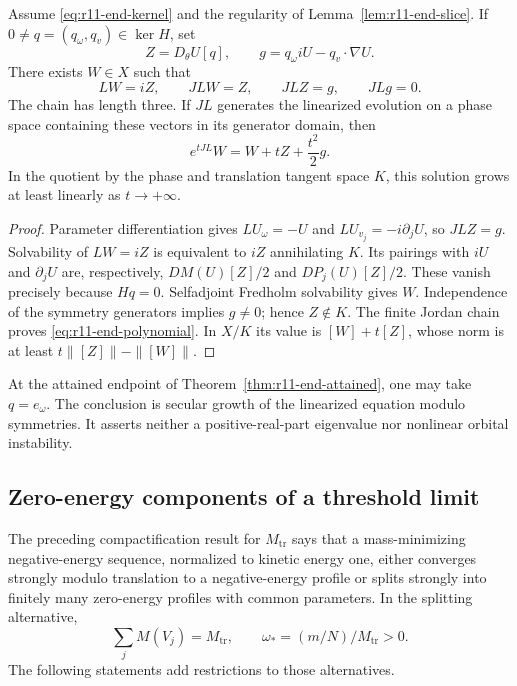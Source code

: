 \begin{theorem}
\label{thm:r11-end-jordan}
Assume \eqref{eq:r11-end-kernel} and the regularity of
Lemma~\ref{lem:r11-end-slice}.  If $0\ne q=(q_\omega,q_v)\in\ker H$,
set
\[
 Z=D_\theta U[q],\qquad
 g=q_\omega iU-q_v\cdot\nabla U.
\]
There exists $W\in X$ such that
\begin{equation}\label{eq:r11-end-chain}
 LW=iZ,\qquad JLW=Z,\qquad JLZ=g,\qquad JLg=0.
\end{equation}
The chain has length three.  If $JL$ generates the linearized evolution
on a phase space containing these vectors in its generator domain, then
\begin{equation}\label{eq:r11-end-polynomial}
 e^{tJL}W=W+tZ+\frac{t^2}{2}g.
\end{equation}
In the quotient by the phase and translation tangent space $K$, this
solution grows at least linearly as $t\to+\infty$.
\end{theorem}
\begin{proof}
Parameter differentiation gives
$LU_\omega=-U$ and $LU_{v_j}=-i\partial_jU$, so $JLZ=g$.
Solvability of $LW=iZ$ is equivalent to $iZ$ annihilating $K$.
Its pairings with $iU$ and $\partial_jU$ are, respectively,
$DM(U)[Z]/2$ and $DP_j(U)[Z]/2$.  These vanish precisely because
$Hq=0$.  Selfadjoint Fredholm solvability gives $W$.
Independence of the symmetry generators implies $g\ne0$; hence
$Z\notin K$.  The finite Jordan chain proves
\eqref{eq:r11-end-polynomial}.  In $X/K$ its value is $[W]+t[Z]$,
whose norm is at least $t\|[Z]\|-\|[W]\|$.
\end{proof}

At the attained endpoint of Theorem~\ref{thm:r11-end-attained}, one may
take $q=e_\omega$.  The conclusion is secular growth of the linearized
equation modulo symmetries.  It asserts neither a positive-real-part
eigenvalue nor nonlinear orbital instability.

\subsection{Zero-energy components of a threshold limit}

The preceding compactification result for $M_{\mathrm{tr}}$ says that a
mass-minimizing negative-energy sequence, normalized to kinetic energy
one, either converges strongly modulo translation to a negative-energy
profile or splits strongly into finitely many zero-energy profiles with
common parameters.  In the splitting alternative,
\[
 \sum_jM(V_j)=M_{\mathrm{tr}},\qquad
 \omega_*=(m/N)/M_{\mathrm{tr}}>0.
\]
The following statements add restrictions to those alternatives.

